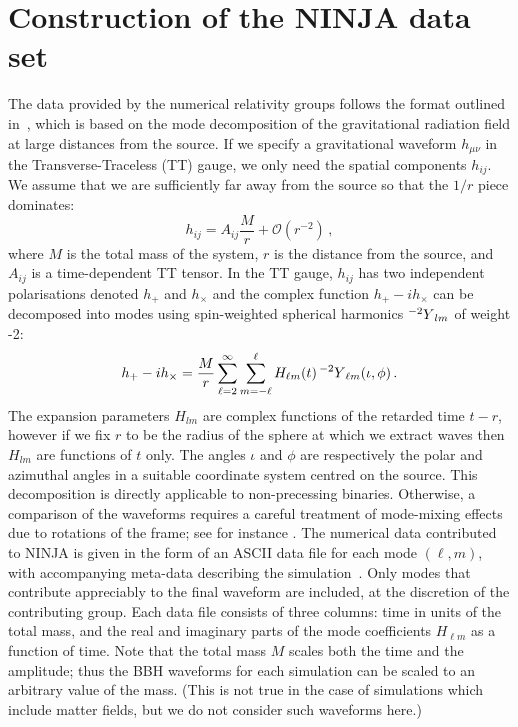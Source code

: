 \fi

\section{Construction of the NINJA data set}
\label{sec:ninja1_ninja_data}

The data provided by the numerical relativity groups follows the
format outlined in~\cite{Brown:2007jx}, which is based on the
mode decomposition of the gravitational radiation field at large
distances from the source. If we specify a gravitational
waveform $h_{\mu\nu}$ in the Transverse-Traceless (TT) gauge, we only
need the spatial components $h_{ij}$. We assume that we are
sufficiently far away from the source so that the $1/r$ piece dominates:
\begin{equation}
  h_{ij} = A_{ij}\frac{M}{r} + \mathcal{O}\left(r^{-2}\right)\,,
\end{equation}
where $M$ is the total mass of the system, $r$ is the distance from
the source, and $A_{ij}$ is a time-dependent TT tensor.  In the TT
gauge, $h_{ij}$ has two independent polarisations denoted $h_+$ and
$h_\times$ and the complex function
$h_+-ih_\times$ can be decomposed into modes using spin-weighted spherical
harmonics ${{}^{-2}Y}_{lm}$ of weight -2:
%
\begin{equation}
\label{eq:mode-decomposition}
  h_+ - ih_\times = \frac{M}{r}\sum_{\ell=2}^{\infty}\sum_{m=-\ell}^\ell H_{\ell m}(t)\,
  {{}^{-2}Y}_{\ell m}(\iota,\phi)\,.
\end{equation}
%
The expansion parameters $H_{lm}$ are complex functions of the
retarded time $t-r$, however if we fix $r$ to be the radius of the
sphere at which we extract waves then $H_{lm}$ are functions of $t$
only. The angles $\iota$ and $\phi$ are respectively the polar and
azimuthal angles in a suitable coordinate system centred on the
source. This decomposition is directly applicable to non-precessing
binaries. Otherwise, a comparison of the waveforms requires a careful
treatment of mode-mixing effects due to rotations of the frame; see
for instance \cite{Gualtieri:2008ux}.  The numerical data contributed
to NINJA is given in the form of an ASCII data file for each mode
$(\ell,m)$, with accompanying meta-data describing the
simulation~\cite{Brown:2007jx}. Only modes that contribute appreciably
to the final waveform are included, at the discretion of the
contributing group.  Each data file consists of three columns: time in
units of the total mass, and the real and imaginary parts of the mode
coefficients $H_{\ell m}$ as a function of time. Note that the total
mass $M$ scales both the time and the amplitude; thus the BBH
waveforms for each simulation can be scaled to an arbitrary value of
the mass.  (This is not true in the case of simulations which include
matter fields, but we do not consider such waveforms here.)

